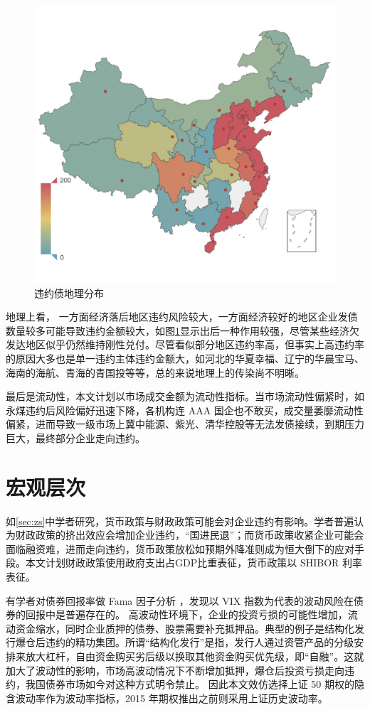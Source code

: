 \begin{figure}[h]
	\centering
	\includegraphics[width=.9\linewidth]{./data/default_by_geo.png}
	\caption{\label{fig:geo}违约债地理分布}
\end{figure}
地理上看，
一方面经济落后地区违约风险较大，一方面经济较好的地区企业发债数量较多可能导致违约金额较大，如图\ref{fig:geo}显示出后一种作用较强，尽管某些经济欠发达地区似乎仍然维持刚性兑付。尽管看似部分地区违约率高，但事实上高违约率的原因大多也是单一违约主体违约金额大，如河北的华夏幸福、辽宁的华晨宝马、海南的海航、青海的青国投等等，总的来说地理上的传染尚不明晰。

最后是流动性，本文计划以市场成交金额为流动性指标。当市场流动性偏紧时，如永煤违约后风险偏好迅速下降，各机构连 AAA 国企也不敢买，成交量萎靡流动性偏紧，进而导致一级市场上冀中能源、紫光、清华控股等无法发债接续，到期压力巨大，最终部分企业走向违约。
\section{宏观层次}
如\ref{sec:zs}中学者研究，货币政策与财政政策可能会对企业违约有影响。学者普遍认为财政政策的挤出效应会增加企业违约，“国进民退”；而货币政策收紧企业可能会面临融资难，进而走向违约，货币政策放松如预期外降准则成为恒大倒下的应对手段。本文计划财政政策使用政府支出占GDP比重表征，货币政策以 SHIBOR 利率表征。

有学者对债券回报率做 Fama 因子分析
\cite{chung2019volatility}
，发现以 VIX 指数为代表的波动风险在债券的回报中是普遍存在的。
高波动性环境下，企业的投资亏损的可能性增加，流动资金缩水，同时企业质押的债券、股票需要补充抵押品。典型的例子是结构化发行爆仓后违约的精功集团。所谓“结构化发行”是指，发行人通过资管产品的分级安排来放大杠杆，自由资金购买劣后级以换取其他资金购买优先级，即“自融”。这就加大了波动性的影响，市场高波动情况下不断增加抵押，爆仓后投资亏损走向违约，我国债券市场如今对这种方式明令禁止。
因此本文效仿选择上证 50 期权的隐含波动率作为波动率指标，2015 年期权推出之前则采用上证历史波动率。
